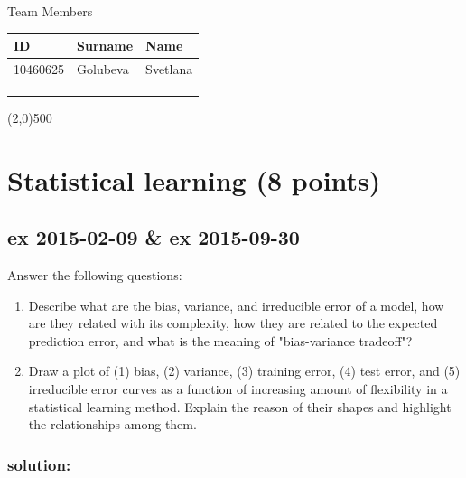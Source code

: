\documentclass[a4paper,12pt,titlepage]{article} %
\begin{document}
\begin{titlepage}
        \vspace{20pt}
        \begin{center}
            {\large Team Members}
        \end{center}
        \begin{tabularx}{\textwidth}{|X|X|X|}
            \hline
            ID & Surname & Name\\
            \hline
            10460625 & Golubeva & Svetlana\\
            \hline
            &  & \\
            \hline
            &  & \\
            \hline
            &  & \\
            \hline
        \end{tabularx}

        \vspace{\fill}
        \begin{center}
            \line(2,0){500}
        \end{center}
		
    \end{titlepage}
\tableofcontents

\newpage
\section{Statistical learning (8 points)}
\subsection{ex 2015-02-09 \& ex 2015-09-30}
Answer the following questions:
\begin{enumerate}
\item Describe what are the bias, variance, and irreducible error of a model, how are they related with its complexity, how they are related to the expected prediction error, and what is the meaning of "bias-variance tradeoff"?
\item Draw a plot of (1) bias, (2) variance, (3) training error, (4) test error, and (5) irreducible error curves as a function of increasing amount of flexibility in a statistical learning method. Explain the reason of their shapes and highlight the relationships among them.
\end{enumerate}

\subsubsection{solution:}
\end{document}
